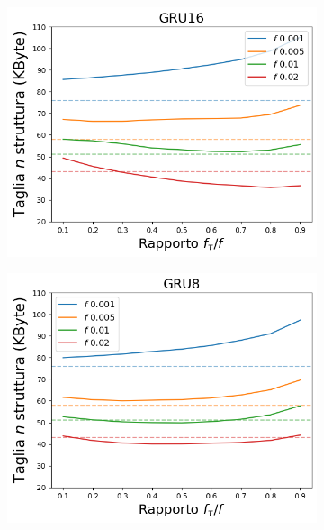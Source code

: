 \documentclass[../../main.tex]{subfiles}
\begin{document}
    \begin{figure}[H]
        \centering
        \begin{subfigure}[b]{0.49\textwidth}
            \centering
            \includegraphics[width = \textwidth]{immagini/7/LBF/GRU16_Taglia.png}
            \caption{}
            \label{fig:LBFTagliaGRU16}
        \end{subfigure}
        \begin{subfigure}[b]{0.49\textwidth}
            \centering
            \includegraphics[width = \textwidth]{immagini/7/LBF/GRU8_Taglia.png}
            \caption{}
            \label{fig:LBFTagliaGRU8}

\end{subfigure}
\end{figure}
\end{document}
